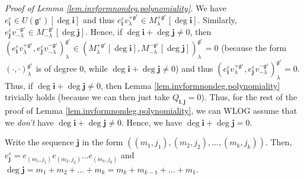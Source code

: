 \documentclass
[numbers=enddot,12pt,final,onecolumn,german,notitlepage]{scrartcl}%
\theoremstyle{definition}
\begin{document}
\textit{Proof of Lemma \ref{lem.invformnondeg.polynomiality}.} We have
$e_{\mathbf{i}}^{\varepsilon}\in U\left(  \mathfrak{g}^{\varepsilon}\right)
\left[  \deg\mathbf{i}\right]  $ and thus $e_{\mathbf{i}}^{\varepsilon
}v_{\lambda}^{+\mathfrak{g}^{\varepsilon}}\in M_{\lambda}^{+\mathfrak{g}%
^{\varepsilon}}\left[  \deg\mathbf{i}\right]  $. Similarly, $e_{\mathbf{j}%
}^{\varepsilon}v_{-\lambda}^{-\mathfrak{g}^{\varepsilon}}\in M_{-\lambda
}^{-\mathfrak{g}^{\varepsilon}}\left[  \deg\mathbf{j}\right]  $. Hence, if
$\deg\mathbf{i}+\deg\mathbf{j}\neq0$, then $\left(  e_{\mathbf{i}%
}^{\varepsilon}v_{\lambda}^{+\mathfrak{g}^{\varepsilon}},e_{\mathbf{j}%
}^{\varepsilon}v_{-\lambda}^{-\mathfrak{g}^{\varepsilon}}\right)  _{\lambda
}^{\mathfrak{g}^{\varepsilon}}\in\left(  M_{\lambda}^{+\mathfrak{g}%
^{\varepsilon}}\left[  \deg\mathbf{i}\right]  ,M_{-\lambda}^{-\mathfrak{g}%
^{\varepsilon}}\left[  \deg\mathbf{j}\right]  \right)  _{\lambda
}^{\mathfrak{g}^{\varepsilon}}=0$ (because the form $\left(  \cdot
,\cdot\right)  _{\lambda}^{\mathfrak{g}^{\varepsilon}}$ is of degree $0$,
while $\deg\mathbf{i}+\deg\mathbf{j}\neq0$) and thus $\left(  e_{\mathbf{i}%
}^{\varepsilon}v_{\lambda}^{+\mathfrak{g}^{\varepsilon}},e_{\mathbf{j}%
}^{\varepsilon}v_{-\lambda}^{-\mathfrak{g}^{\varepsilon}}\right)  _{\lambda
}^{\mathfrak{g}^{\varepsilon}}=0$. Thus, if $\deg\mathbf{i}+\deg\mathbf{j}%
\neq0$, then Lemma \ref{lem.invformnondeg.polynomiality} trivially holds
(because we can then just take $Q_{\mathbf{i},\mathbf{j}}=0$). Thus, for the
rest of the proof of Lemma \ref{lem.invformnondeg.polynomiality}, we can WLOG
assume that we \textit{don't} have $\deg\mathbf{i}+\deg\mathbf{j}\neq0$.
Hence, we have $\deg\mathbf{i}+\deg\mathbf{j}=0$.

Write the sequence $\mathbf{j}$ in the form $\left(  \left(  m_{1}%
,j_{1}\right)  ,\left(  m_{2},j_{2}\right)  ,...,\left(  m_{k},j_{k}\right)
\right)  $. Then, $e_{\mathbf{j}}^{\varepsilon}=e_{\left(  m_{1},j_{1}\right)
}e_{\left(  m_{2},j_{2}\right)  }...e_{\left(  m_{k},j_{k}\right)  }$ and
$\deg\mathbf{j}=m_{1}+m_{2}+...+m_{k}=m_{k}+m_{k-1}+...+m_{1}$.
\end{document}
